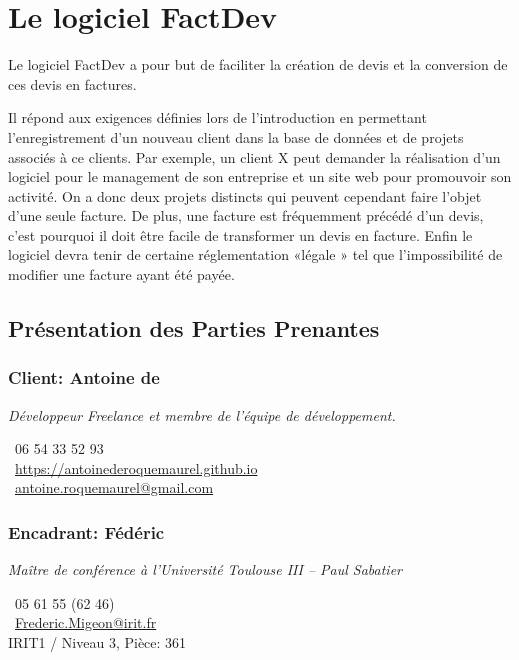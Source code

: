 \section{Le logiciel FactDev}
Le logiciel FactDev a pour but de faciliter la création de devis et la conversion de ces devis en factures. 

Il répond aux exigences définies lors de l'introduction en permettant l'enregistrement d'un nouveau client dans la base de données et de projets associés à ce clients. Par exemple, un client X peut demander la réalisation d'un logiciel pour le management de son entreprise et un site web pour promouvoir son activité. On a donc deux projets distincts qui peuvent cependant faire l'objet d'une seule facture. De plus, une facture est fréquemment précédé d'un devis, c'est pourquoi il doit être facile de transformer un devis en facture. Enfin le logiciel devra tenir de certaine réglementation «légale » tel que l'impossibilité de modifier une facture ayant été payée. 

\subsection{Présentation des Parties Prenantes}
	\subsubsection{Client: Antoine de }
	\begin{flushleft} \textit{Développeur Freelance et membre de l'équipe de développement. }

		\Telefon~06 54 33 52 93\\
		\Mundus~\url{https://antoinederoquemaurel.github.io}\\
		\Letter~\href{mailto:antoine.roquemaurel@gmail.com}{antoine.roquemaurel@gmail.com} \\		
\end{flushleft}
	\subsubsection{Encadrant: Fédéric }
	\begin{flushleft} 
	\textit{Maître de conférence à l'Université Toulouse III -- Paul Sabatier}

		\Telefon~05 61 55 (62 46) \\
		\Letter~\href{mailto:Frederic.Migeon@irit.fr}{Frederic.Migeon@irit.fr} \\
		IRIT1 / Niveau 3, Pièce: 361 \\
\end{flushleft}
